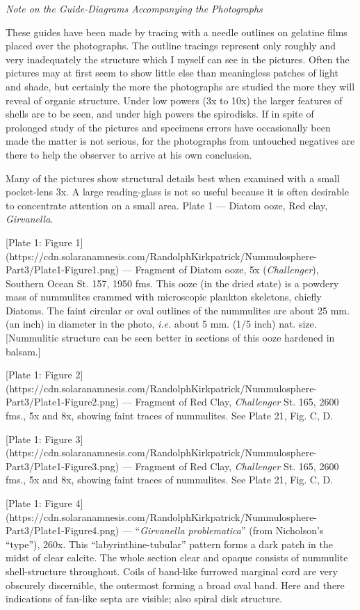 \documentclass[a4paper, 12pt, oneside]{article}
\begin{document}
\bigskip
\centerline{\emph{Note on the Guide-Diagrams Accompanying the Photographs}}

These guides have been made by tracing with a needle outlines on gelatine films placed over the photographs. The outline tracings represent only roughly and very inadequately the structure which I myself can see in the pictures. Often the pictures may at first seem to show little else than meaningless patches of light and shade, but certainly the more the photographs are studied the more they will reveal of organic structure. Under low powers (3x to 10x) the larger features of shells are to be seen, and under high powers the spirodisks. If in spite of prolonged study of the pictures and specimens errors have occasionally been made the matter is not serious, for the photographs from untouched negatives are there to help the observer to arrive at his own conclusion.

Many of the pictures show structural details best when examined with a small pocket-lens 3x. A large reading-glass is not so useful because it is often desirable to concentrate attention on a small area.
\clearpage
Plate 1 --- Diatom ooze, Red clay, \emph{Girvanella}.

[Plate 1: Figure 1](https://cdn.solaranamnesis.com/RandolphKirkpatrick/Nummulosphere-Part3/Plate1-Figure1.png) --- Fragment of Diatom ooze, 5x (\emph{Challenger}), Southern Ocean St. 157, 1950 fms. This ooze (in the dried state) is a powdery mass of nummulites crammed with microscopic plankton skeletons, chiefly Diatoms. The faint circular or oval outlines of the nummulites are about 25 mm. (an inch) in diameter in the photo, \emph{i.e.} about 5 mm. (1/5 inch) nat. size. [Nummulitic structure can be seen better in sections of this ooze hardened in balsam.]

[Plate 1: Figure 2](https://cdn.solaranamnesis.com/RandolphKirkpatrick/Nummulosphere-Part3/Plate1-Figure2.png) --- Fragment of Red Clay, \emph{Challenger} St. 165, 2600 fms., 5x and 8x, showing faint traces of nummulites. See Plate 21, Fig. C, D.

[Plate 1: Figure 3](https://cdn.solaranamnesis.com/RandolphKirkpatrick/Nummulosphere-Part3/Plate1-Figure3.png) --- Fragment of Red Clay, \emph{Challenger} St. 165, 2600 fms., 5x and 8x, showing faint traces of nummulites. See Plate 21, Fig. C, D.

[Plate 1: Figure 4](https://cdn.solaranamnesis.com/RandolphKirkpatrick/Nummulosphere-Part3/Plate1-Figure4.png) --- ``\emph{Girvanella problematica}'' (from Nicholson's ``type''), 260x. This ``labyrinthine-tubular'' pattern forms a dark patch in the midst of clear calcite. The whole section clear and opaque consists of nummulite shell-structure throughout. Coils of band-like furrowed marginal cord are very obscurely discernible, the outermost forming a broad oval band. Here and there indications of fan-like septa are visible; also spiral disk structure.
\end{document}
